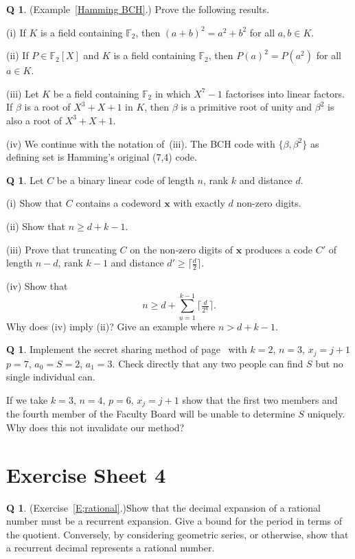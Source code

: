 \documentclass[12pt,a4paper]{article}
\theoremstyle{plain}
\theoremstyle{definition}
\newtheorem{question}[theorem]{Q}
\begin{document}
\begin{question}\label{C3.13}
(Example~\ref{Hamming BCH}.)
Prove the following results.

(i) If $K$ is a field containing
${\mathbb F}_{2}$, then $(a+b)^{2}=a^{2}+b^{2}$
for all $a,b\in K$.

(ii) If $P\in {\mathbb F}_{2}[X]$ and $K$ is a field containing
${\mathbb F}_{2}$, then $P(a)^{2}=P(a^{2})$
for all $a\in K$.

(iii) Let $K$ be a field containing
${\mathbb F}_{2}$ in which $X^{7}-1$ factorises
into linear factors. If $\beta$ is a root of $X^{3}+X+1$
in $K$, then $\beta$ is a primitive root of unity
and $\beta^{2}$ is also a root of $X^{3}+X+1$.

(iv) We continue with the notation of~(iii).
The BCH
code with $\{\beta,\beta^{2}\}$ as defining set
is Hamming's original (7,4) code.
\end{question}
\begin{question}\label{C3.14} Let $C$ be a binary linear code of length
$n$, rank $k$ and distance $d$.

(i) Show that $C$ contains a codeword ${\mathbf x}$ with exactly
$d$ non-zero digits.

(ii) Show that $n\geq d+k-1$.

(iii) Prove that truncating $C$ on the non-zero
digits of ${\mathbf x}$ produces a code
$C'$ of length $n-d$, rank $k-1$ and distance
$d'\geq\lceil \tfrac{d}{2}\rceil$.

\noindent[Hint: To show $d'\geq\lceil \tfrac{d}{2}\rceil$,
consider, for ${\mathbf y}\in C$, the coordinates
where $x_{j}=y_{j}$ and the coordinates
where $x_{j}\neq y_{j}$.]

(iv) Show that
\[n\geq d+\sum_{u=1}^{k-1}\lceil \tfrac{d}{2^{u}}\rceil.\]
Why does (iv) imply (ii)? Give an example where
$n>d+k-1$.  
\end{question}
\begin{question}\label{C3.15} Implement the secret sharing method
of page~\pageref{P;secret sharing} with $k=2$, $n=3$, $x_{j}=j+1$
$p=7$, $a_{0}=S=2$, $a_{1}=3$. Check directly that any two
people
can find $S$ but no single individual can.

If we take $k=3$, $n=4$,
$p=6$,  $x_{j}=j+1$ show that 
the first two members and the
fourth member of the Faculty Board will
be unable to determine $S$ uniquely.
Why does this not invalidate our method?
\end{question}
\newpage
\section{Exercise Sheet 4}
\begin{question} (Exercise~\ref{E;rational}.)\label{C4.1} 
Show that the decimal expansion of
a rational number must be a recurrent expansion.
Give a bound for the period in terms of the quotient.
Conversely, by considering geometric series, or otherwise,
show that a recurrent decimal represents
a rational number.
\end{question}
\end{document}
